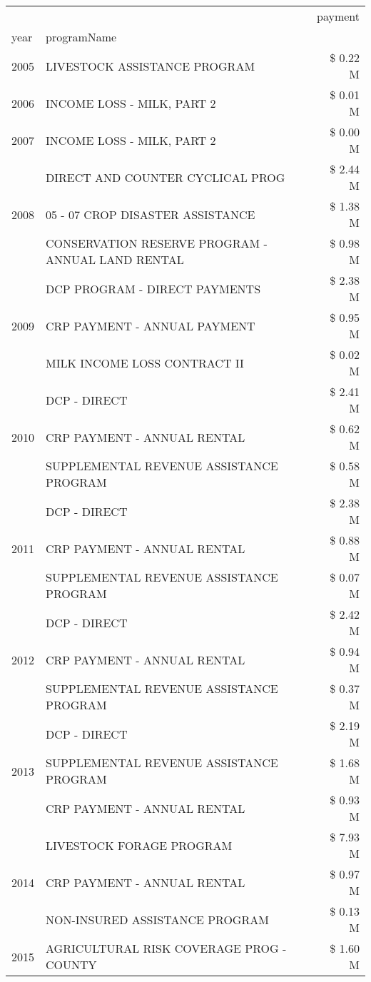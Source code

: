 \begin{tabular}{llr}
\toprule
 &  & payment \\
year & programName &  \\
\midrule
2005 & LIVESTOCK ASSISTANCE PROGRAM & \$ 0.22 M \\
\cline{1-3}
2006 & INCOME LOSS - MILK, PART 2 & \$ 0.01 M \\
\cline{1-3}
2007 & INCOME LOSS - MILK, PART 2 & \$ 0.00 M \\
\cline{1-3}
\multirow[t]{3}{*}{2008} & DIRECT AND COUNTER CYCLICAL PROG & \$ 2.44 M \\
 & 05 - 07 CROP DISASTER ASSISTANCE & \$ 1.38 M \\
 & CONSERVATION RESERVE PROGRAM - ANNUAL LAND RENTAL & \$ 0.98 M \\
\cline{1-3}
\multirow[t]{3}{*}{2009} & DCP PROGRAM - DIRECT PAYMENTS & \$ 2.38 M \\
 & CRP PAYMENT - ANNUAL PAYMENT & \$ 0.95 M \\
 & MILK INCOME LOSS CONTRACT II & \$ 0.02 M \\
\cline{1-3}
\multirow[t]{3}{*}{2010} & DCP - DIRECT & \$ 2.41 M \\
 & CRP PAYMENT - ANNUAL RENTAL & \$ 0.62 M \\
 & SUPPLEMENTAL REVENUE ASSISTANCE PROGRAM & \$ 0.58 M \\
\cline{1-3}
\multirow[t]{3}{*}{2011} & DCP - DIRECT & \$ 2.38 M \\
 & CRP PAYMENT - ANNUAL RENTAL & \$ 0.88 M \\
 & SUPPLEMENTAL REVENUE ASSISTANCE PROGRAM & \$ 0.07 M \\
\cline{1-3}
\multirow[t]{3}{*}{2012} & DCP - DIRECT & \$ 2.42 M \\
 & CRP PAYMENT - ANNUAL RENTAL & \$ 0.94 M \\
 & SUPPLEMENTAL REVENUE ASSISTANCE PROGRAM & \$ 0.37 M \\
\cline{1-3}
\multirow[t]{3}{*}{2013} & DCP - DIRECT & \$ 2.19 M \\
 & SUPPLEMENTAL REVENUE ASSISTANCE PROGRAM & \$ 1.68 M \\
 & CRP PAYMENT - ANNUAL RENTAL & \$ 0.93 M \\
\cline{1-3}
\multirow[t]{3}{*}{2014} & LIVESTOCK FORAGE PROGRAM & \$ 7.93 M \\
 & CRP PAYMENT - ANNUAL RENTAL & \$ 0.97 M \\
 & NON-INSURED ASSISTANCE PROGRAM & \$ 0.13 M \\
\cline{1-3}
\multirow[t]{3}{*}{2015} & AGRICULTURAL RISK COVERAGE PROG - COUNTY & \$ 1.60 M \\

\end{tabular}
